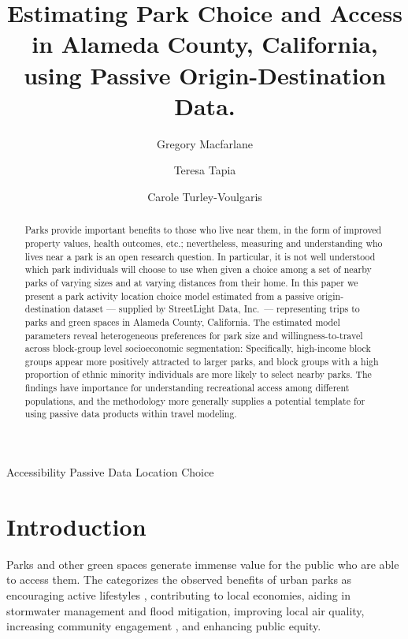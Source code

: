 \documentclass[]{elsarticle} %
\begin{document}
\begin{frontmatter}

  \title{Estimating Park Choice and Access in Alameda County, California, using Passive Origin-Destination Data.}
    \author[Brigham Young University]{Gregory Macfarlane}
    \author[]{Teresa Tapia}
    \author[Harvard University]{Carole Turley-Voulgaris}
      \address[Brigham Young University]{Civil and Environmental Engineering Department, 430 Engineering Building, Provo, Utah 84602}
    \address[Harvard University]{Some Other Place}
  
  \begin{abstract}
  Parks provide important benefits to those who live near them, in the form of improved property values, health outcomes, etc.; nevertheless, measuring and understanding who lives near a park is an open research question. In particular, it is not well understood which park individuals will choose to use when given a choice among a set of nearby parks of varying sizes and at varying distances from their home. In this paper we present a park activity location choice model estimated from a passive origin-destination dataset --- supplied by StreetLight Data, Inc.~--- representing trips to parks and green spaces in Alameda County, California. The estimated model parameters reveal heterogeneous preferences for park size and willingness-to-travel across block-group level socioeconomic segmentation: Specifically, high-income block groups appear more positively attracted to larger parks, and block groups with a high proportion of ethnic minority individuals are more likely to select nearby parks. The findings have importance for understanding recreational access among different populations, and the methodology more generally supplies a potential template for using passive data products within travel modeling.
  \end{abstract}
   \begin{keyword} Accessibility Passive Data Location Choice\end{keyword}
 \end{frontmatter}

\hypertarget{intro}{%
\section{Introduction}\label{intro}}

Parks and other green spaces generate immense value for the public who are able
to access them. The \citet{CityParksAlliance} categorizes the observed benefits of
urban parks as encouraging active lifestyles \citep{Bancroft2015}, contributing to
local economies, aiding in stormwater management and flood mitigation,
improving local air quality, increasing community engagement \citep{Madzia2018}, and
enhancing public equity.
\end{document}
